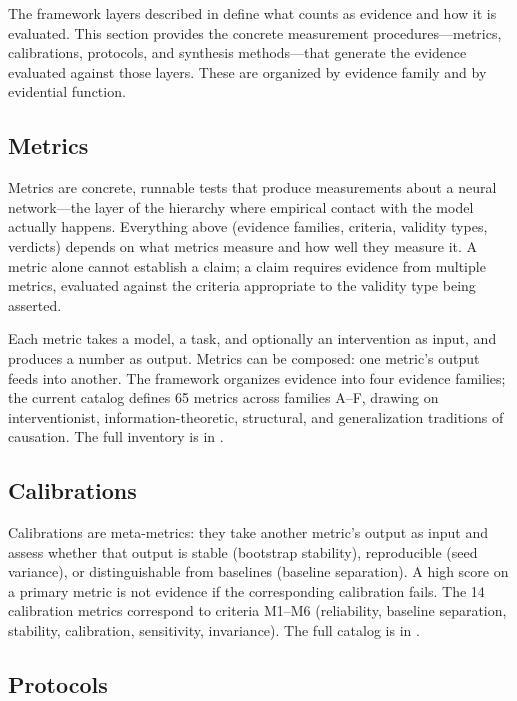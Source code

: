 \documentclass{article}
\begin{document}
The framework layers described in  define what counts as evidence and how it is evaluated. This section provides the concrete measurement procedures---metrics, calibrations, protocols, and synthesis methods---that generate the evidence evaluated against those layers. These are organized by evidence family and by evidential function.

\subsection{Metrics}
\label{sec:metrics}

Metrics are concrete, runnable tests that produce measurements about a neural network---the layer of the hierarchy where empirical contact with the model actually happens. Everything above (evidence families, criteria, validity types, verdicts) depends on what metrics measure and how well they measure it. A metric alone cannot establish a claim; a claim requires evidence from multiple metrics, evaluated against the criteria appropriate to the validity type being asserted.

Each metric takes a model, a task, and optionally an intervention as input, and produces a number as output. Metrics can be composed: one metric's output feeds into another. The framework organizes evidence into four evidence families; the current catalog defines 65 metrics across families A--F, drawing on interventionist, information-theoretic, structural, and generalization traditions of causation. The full inventory is in .

\subsection{Calibrations}
\label{sec:calibrations}

Calibrations are meta-metrics: they take another metric's output as input and assess whether that output is stable (bootstrap stability), reproducible (seed variance), or distinguishable from baselines (baseline separation). A high score on a primary metric is not evidence if the corresponding calibration fails. The 14 calibration metrics correspond to criteria M1--M6 (reliability, baseline separation, stability, calibration, sensitivity, invariance). The full catalog is in .

\subsection{Protocols}
\label{sec:methodology-protocols}
\end{document}
